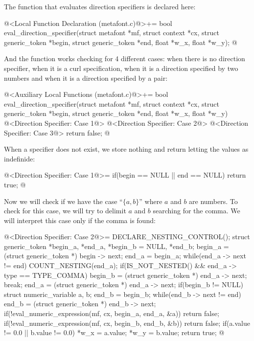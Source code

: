 The function that evaluates direction specifiers is declared here:

\iniciocodigo
@<Local Function Declaration (metafont.c)@>+=
bool eval_direction_specifier(struct metafont *mf, struct context *cx,
                              struct generic_token *begin,
                              struct generic_token *end, float *w_x,
                              float *w_y);
@
\fimcodigo

And the function works checking for 4 different cases: when there is
no direction specifier, when it is a curl specification, when it is a
direction specified by two numbers and when it is a direction
specified by a pair:

\iniciocodigo
@<Auxiliary Local Functions (metafont.c)@>+=
bool eval_direction_specifier(struct metafont *mf, struct context *cx,
                              struct generic_token *begin,
                              struct generic_token *end, float *w_x,
                              float *w_y){
  @<Direction Specifier: Case 1@>
  @<Direction Specifier: Case 2@>
  @<Direction Specifier: Case 3@>
  return false;
}
@
\fimcodigo

When a specifier does not exist, we store nothing and return letting
the values as indefinide:

\iniciocodigo
@<Direction Specifier: Case 1@>=
if(begin == NULL || end == NULL){
  return true;
}
@
\fimcodigo

Now we will check if we have the case ``$\{ a , b\}$'' where $a$ and
$b$ are numbers. To check for this case, we will try to delimit $a$
and $b$ searching for the comma. We will interpret this case only if
the comma is found:

\iniciocodigo
@<Direction Specifier: Case 2@>=
DECLARE_NESTING_CONTROL();
struct generic_token *begin_a, *end_a, *begin_b = NULL, *end_b;
begin_a = (struct generic_token *) begin -> next;
end_a = begin_a;
while(end_a -> next != end){
  COUNT_NESTING(end_a);
  if(IS_NOT_NESTED() && end_a -> type == TYPE_COMMA){
    begin_b = (struct generic_token *) end_a -> next;
    break;
  }
  end_a = (struct generic_token *) end_a -> next;
}
if(begin_b != NULL){
  struct numeric_variable a, b;
  end_b = begin_b;
  while(end_b -> next != end)
    end_b = (struct generic_token *) end_b -> next;
  if(!eval_numeric_expression(mf, cx, begin_a, end_a, &a))
    return false;
  if(!eval_numeric_expression(mf, cx, begin_b, end_b, &b))
    return false;
  if(a.value != 0.0 || b.value != 0.0){
    *w_x = a.value;
    *w_y = b.value;
  }
  return true;
}
@
\fimcodigo

